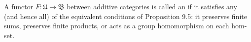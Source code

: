 A functor $F: \mathfrak{U} \to \mathfrak{B}$ between additive categories is called an  if it satisfies any (and hence all) of the equivalent conditions of Proposition 9.5: it preserves finite sums, preserves finite products, or acts as a group homomorphism on each hom-set.
